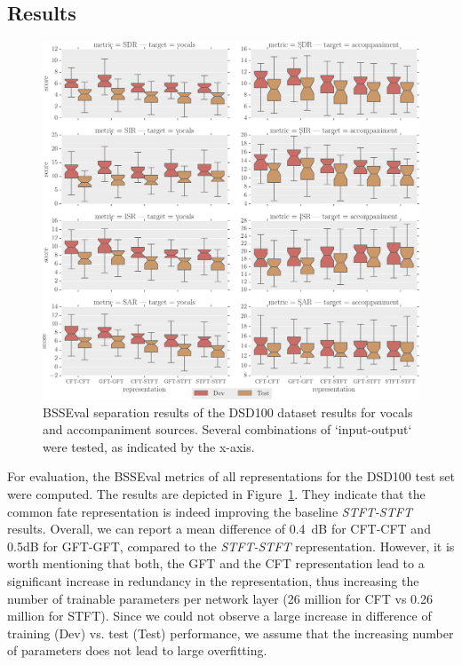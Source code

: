 \subsection{Results}

\begin{figure}[t]
\centering
\includegraphics[width=1.1\textwidth]{Chapters/06_Separation_Unknown/figures/boxplot.pdf}
\caption{BSSEval separation results of the DSD100 dataset results for vocals and accompaniment sources. Several combinations of `input-output` were tested, as indicated by the x-axis.}
\label{fig:deep_cft_boxplots}
\end{figure}

For evaluation, the BSSEval metrics of all representations for the DSD100 test set were computed.
The results are depicted in Figure~\ref{fig:deep_cft_boxplots}.
They indicate that the common fate representation is indeed improving the baseline \emph{STFT-STFT} results.
Overall, we can report a mean difference of 0.4~dB for CFT-CFT and 0.5dB for GFT-GFT, compared to the \emph{STFT-STFT} representation.
However, it is worth mentioning that both, the GFT and the CFT representation lead to a significant increase in redundancy in the representation, thus increasing the number of trainable parameters per network layer (26 million for CFT vs 0.26 million for \acs{STFT}). Since we could not observe a large increase in difference of training (Dev) vs. test (Test) performance, we assume that the increasing number of parameters does not lead to large overfitting.

